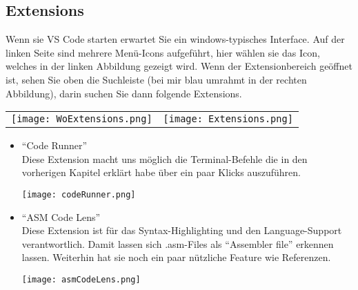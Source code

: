 \subsection{Extensions}
\label{sub:extensions}
Wenn sie VS Code starten erwartet Sie ein windows-typisches Interface. Auf der linken Seite sind mehrere Menü-Icons aufgeführt, hier wählen sie das Icon, welches in der linken Abbildung gezeigt wird. Wenn der Extensionbereich geöffnet ist, sehen Sie oben die Suchleiste (bei mir blau umrahmt in der rechten Abbildung), darin suchen Sie dann folgende Extensions.
\begin{center}
    \begin{tabular}{c c}
        \texttt{[image: WoExtensions.png]} & \hspace{2cm} \texttt{[image: Extensions.png]}
    \end{tabular}
\end{center}
\begin{itemize}
    \item \enquote{Code Runner}\\
    Diese Extension macht uns möglich die Terminal-Befehle die in den vorherigen Kapitel erklärt habe über ein paar Klicks auszuführen.
    \begin{center}
        \texttt{[image: codeRunner.png]}
    \end{center}
    \item \enquote{ASM Code Lens}\\
    Diese Extension ist für das Syntax-Highlighting und den Language-Support verantwortlich. Damit lassen sich {\ttfamily .asm}-Files als \enquote{Assembler file} erkennen lassen. Weiterhin hat sie noch ein paar nützliche Feature wie Referenzen.
    \begin{center}
        \texttt{[image: asmCodeLens.png]}
    \end{center}
\end{itemize}
\newpage
